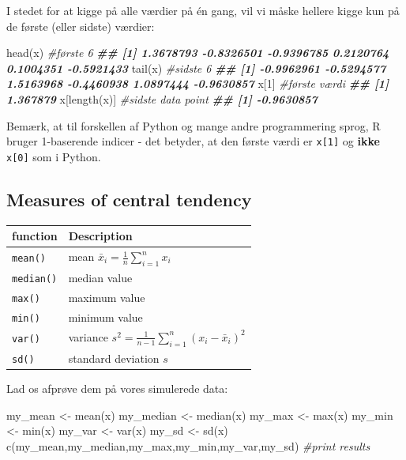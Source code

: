\documentclass[
]{book}
\newenvironment{Shaded}{\begin{snugshade}}{\end{snugshade}}
\newcommand{\CommentTok}[1]{\textcolor[rgb]{0.56,0.35,0.01}{\textit{#1}}}
\newcommand{\DecValTok}[1]{\textcolor[rgb]{0.00,0.00,0.81}{#1}}
\newcommand{\DocumentationTok}[1]{\textcolor[rgb]{0.56,0.35,0.01}{\textbf{\textit{#1}}}}
\newcommand{\FunctionTok}[1]{\textcolor[rgb]{0.00,0.00,0.00}{#1}}
\newcommand{\NormalTok}[1]{#1}
\newcommand{\OtherTok}[1]{\textcolor[rgb]{0.56,0.35,0.01}{#1}}
\begin{document}
I stedet for at kigge på alle værdier på én gang, vil vi måske hellere kigge kun på de første (eller sidste) værdier:

\begin{Shaded}
\begin{Highlighting}[]
\FunctionTok{head}\NormalTok{(x) }\CommentTok{\#første 6}
\DocumentationTok{\#\# [1]  1.3678793 {-}0.8326501 {-}0.9396785  0.2120764  0.1004351 {-}0.5921433}
\FunctionTok{tail}\NormalTok{(x) }\CommentTok{\#sidste 6}
\DocumentationTok{\#\# [1] {-}0.9962961 {-}0.5294577  1.5163968 {-}0.4460938  1.0897444 {-}0.9630857}
\NormalTok{x[}\DecValTok{1}\NormalTok{] }\CommentTok{\#første værdi}
\DocumentationTok{\#\# [1] 1.367879}
\NormalTok{x[}\FunctionTok{length}\NormalTok{(x)] }\CommentTok{\#sidste data point}
\DocumentationTok{\#\# [1] {-}0.9630857}
\end{Highlighting}
\end{Shaded}

Bemærk, at til forskellen af Python og mange andre programmering sprog, R bruger 1-baserende indicer - det betyder, at den første værdi er \texttt{x{[}1{]}} og \textbf{ikke} \texttt{x{[}0{]}} som i Python.

\hypertarget{measures-of-central-tendency}{%
\subsection{Measures of central tendency}\label{measures-of-central-tendency}}

\begin{longtable}[]{@{}ll@{}}
\toprule
function & Description \\
\midrule
\endhead
\texttt{mean()} & mean \(\bar{x}_{i} = \frac{1}{n}\sum_{i=1}^{n} x_{i}\) \\
\texttt{median()} & median value \\
\texttt{max()} & maximum value \\
\texttt{min()} & minimum value \\
\texttt{var()} & variance \(s^2 = \frac{1}{n-1}\sum_{i=1}^{n} (x_{i} - \bar{x}_{i})^2\) \\
\texttt{sd()} & standard deviation \(s\) \\
\bottomrule
\end{longtable}

Lad os afprøve dem på vores simulerede data:

\begin{Shaded}
\begin{Highlighting}[]
\NormalTok{my\_mean }\OtherTok{\textless{}{-}} \FunctionTok{mean}\NormalTok{(x)}
\NormalTok{my\_median }\OtherTok{\textless{}{-}} \FunctionTok{median}\NormalTok{(x)}
\NormalTok{my\_max }\OtherTok{\textless{}{-}} \FunctionTok{max}\NormalTok{(x)}
\NormalTok{my\_min }\OtherTok{\textless{}{-}} \FunctionTok{min}\NormalTok{(x)}
\NormalTok{my\_var }\OtherTok{\textless{}{-}} \FunctionTok{var}\NormalTok{(x)}
\NormalTok{my\_sd }\OtherTok{\textless{}{-}} \FunctionTok{sd}\NormalTok{(x)}
\FunctionTok{c}\NormalTok{(my\_mean,my\_median,my\_max,my\_min,my\_var,my\_sd) }\CommentTok{\#print results}
\end{Highlighting}
\end{Shaded}
\end{document}
